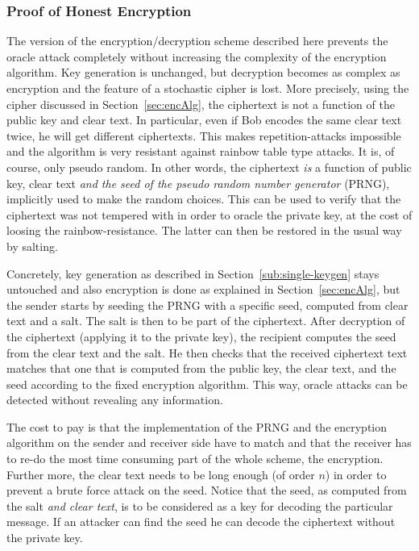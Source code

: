\documentclass[final,journal,compsoc]{IEEEtran}
\begin{document}
\subsubsection{Proof of Honest Encryption\label{sec:honest}}

The version of the
encryption/decryption scheme described here  prevents the oracle attack
completely without increasing the complexity of the encryption
algorithm. Key generation is unchanged, but decryption becomes as
complex as encryption and the feature of a stochastic cipher is lost.
More precisely, using the cipher discussed in
Section~\ref{sec:encAlg}, the ciphertext is not a function of the public
key and clear text. In particular, even if Bob encodes the same clear
text twice, he will get different ciphertexts. This makes
repetition-attacks impossible and the algorithm is very
resistant against rainbow table type attacks. It is, of course,
only pseudo random. In other words, the ciphertext \emph{is} a function of
public key, clear text \emph{and the seed of the pseudo random number
  generator} (PRNG), implicitly used to make the random choices. This
can be used to verify that the ciphertext was not tempered with in order
to oracle the private key, at the cost of loosing the
rainbow-resistance. The latter can then be restored in the usual way
by salting.

Concretely, key generation as described in
Section~\ref{sub:single-keygen} stays untouched and also encryption is
done as explained in Section~\ref{sec:encAlg}, but the sender starts
by seeding the PRNG with a specific seed, computed from clear text and
a salt.  The salt is then to be part of the ciphertext.  
After decryption of the ciphertext (applying it to the private key), the
recipient computes the seed from the clear text and the salt. He then
checks that the received ciphertext text matches that one that is computed
from the public key, the clear text, and the seed according to the
fixed encryption algorithm.  This way, oracle attacks can be detected
without revealing any information. 

The cost to pay is that the
implementation of the PRNG and the encryption algorithm on the sender
and receiver side have to match and that the receiver has to
re-do the most time consuming part of the whole scheme, the
encryption.  Further more, the clear text needs to be long enough (of
order $n$) in order to prevent a brute force attack on the seed.
Notice that the seed, as computed from the salt \emph{and clear text},
is to be considered as a key for decoding the particular message. If
an attacker can find the seed he can decode the ciphertext without
the private key.
\end{document}
